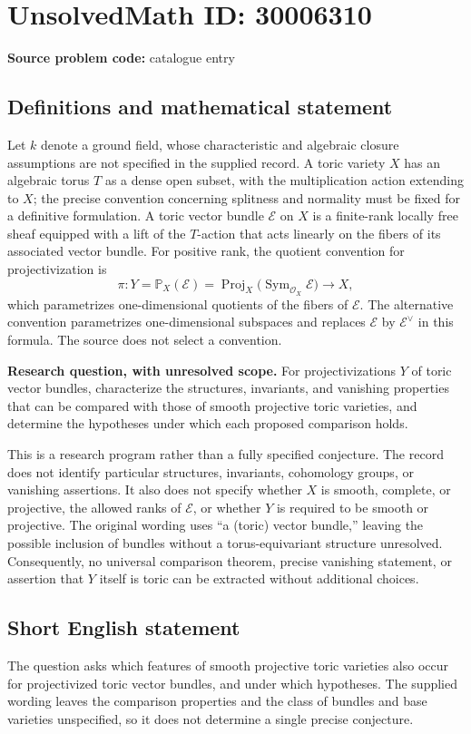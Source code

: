 \documentclass[11pt]{article}
\newcommand{\PP}{\mathbb{P}}
\begin{document}
\section*{UnsolvedMath ID: 30006310}
\textbf{Source problem code:} catalogue entry
\subsection{Definitions and mathematical statement}
Let \(k\) denote a ground field, whose characteristic and algebraic closure assumptions are not specified in the supplied record. A toric variety \(X\) has an algebraic torus \(T\) as a dense open subset, with the multiplication action extending to \(X\); the precise convention concerning splitness and normality must be fixed for a definitive formulation. A toric vector bundle \(\mathcal E\) on \(X\) is a finite-rank locally free sheaf equipped with a lift of the \(T\)-action that acts linearly on the fibers of its associated vector bundle. For positive rank, the quotient convention for projectivization is
\[
\pi\colon Y=\PP_X(\mathcal E)=\operatorname{Proj}_X\!\bigl(\operatorname{Sym}_{\mathcal O_X}\mathcal E\bigr)\longrightarrow X,
\]
which parametrizes one-dimensional quotients of the fibers of \(\mathcal E\). The alternative convention parametrizes one-dimensional subspaces and replaces \(\mathcal E\) by \(\mathcal E^\vee\) in this formula. The source does not select a convention.

\textbf{Research question, with unresolved scope.} For projectivizations \(Y\) of toric vector bundles, characterize the structures, invariants, and vanishing properties that can be compared with those of smooth projective toric varieties, and determine the hypotheses under which each proposed comparison holds.

This is a research program rather than a fully specified conjecture. The record does not identify particular structures, invariants, cohomology groups, or vanishing assertions. It also does not specify whether \(X\) is smooth, complete, or projective, the allowed ranks of \(\mathcal E\), or whether \(Y\) is required to be smooth or projective. The original wording uses ``a (toric) vector bundle,'' leaving the possible inclusion of bundles without a torus-equivariant structure unresolved. Consequently, no universal comparison theorem, precise vanishing statement, or assertion that \(Y\) itself is toric can be extracted without additional choices.
\subsection{Short English statement}
The question asks which features of smooth projective toric varieties also occur for projectivized toric vector bundles, and under which hypotheses. The supplied wording leaves the comparison properties and the class of bundles and base varieties unspecified, so it does not determine a single precise conjecture.
\end{document}
